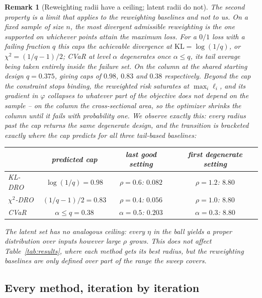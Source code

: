 \documentclass[11pt]{article}
\newtheorem{remark}{Remark}
\newcommand{\design}{\varphi}
\begin{document}
\begin{remark}[Reweighting radii have a ceiling; latent radii do not]
\label{rem:ceiling}
The second property is a limit that applies to the reweighting baselines and not to us. On
a fixed sample of size $n$, the most divergent admissible reweighting is the one supported
on whichever points attain the maximum loss. For a $0/1$ loss with a failing fraction $q$
this caps the achievable divergence at $\mathrm{KL}=\log(1/q)$, or
$\chi^2=(1/q-1)/2$; CVaR at level $\alpha$ degenerates once $\alpha\le q$, its tail average
being taken entirely inside the failure set. On the column at the shared starting design
$q=0.375$, giving caps of $0.98$, $0.83$ and $0.38$ respectively. Beyond the cap the constraint stops binding, the reweighted risk saturates
at $\max_i \ell_i$, and its gradient in $\design$ collapses to whatever part of the
objective does not depend on the sample -- on the column the cross-sectional area, so the optimizer
shrinks the column until it fails with probability one. We observe exactly this: every
radius past the cap returns the same degenerate design, and the transition is bracketed
exactly where the cap predicts for all three tail-based baselines:

\begin{center}\small
\begin{tabular}{lccc}
\toprule
 & predicted cap & last good setting & first degenerate setting \\
\midrule
KL-DRO       & $\log(1/q)=0.98$   & $\rho=0.6$: $0.082$ & $\rho=1.2$: $8.80$ \\
$\chi^2$-DRO & $(1/q-1)/2=0.83$   & $\rho=0.4$: $0.056$ & $\rho=1.0$: $8.80$ \\
CVaR         & $\alpha\le q=0.38$ & $\alpha=0.5$: $0.203$ & $\alpha=0.3$: $8.80$ \\
\bottomrule
\end{tabular}
\end{center}

\noindent The latent set has no analogous ceiling: every $\eta$ in the ball yields a proper
distribution over inputs however large $\rho$ grows. This does not affect
Table~\ref{tab:results}, where each method gets its best radius, but the reweighting
baselines are only defined over part of the range the sweep covers.
\end{remark}

\subsection{Every method, iteration by iteration}
\end{document}

